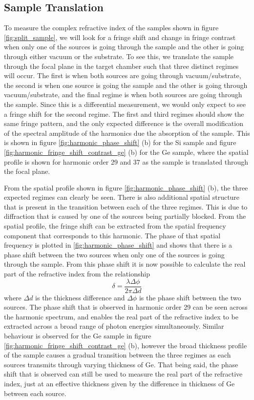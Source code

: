 \subsection{Sample Translation}
To measure the complex refractive index of the samples shown in figure \ref{fig:split_sample}, we will look for a fringe shift and change in fringe contrast when only one of the sources is going through the sample and the other is going through either vacuum or the substrate.  To see this, we translate the sample through the focal plane in the target chamber such that three distinct regimes will occur.  The first is when both sources are going through vacuum/substrate, the second is when one source is going the sample and the other is going through vacuum/substrate, and the final regime is when both sources are going through the sample.  Since this is a differential measurement, we would only expect to see a fringe shift for the second regime.  The first and third regimes should show the same fringe pattern, and the only expected difference is the overall modification of the spectral amplitude of the harmonics due the absorption of the sample.  This is shown in figure \ref{fig:harmonic_phase_shift} (b) for the Si sample and figure \ref{fig:harmonic_fringe_shift_contrast_ge} (b) for the Ge sample, where the spatial profile is shown for harmonic order 29 and 37 as the sample is translated through the focal plane.

From the spatial profile shown in figure \ref{fig:harmonic_phase_shift} (b), the three expected regimes can clearly be seen.  There is also additional spatial structure that is present in the transition between each of the three regimes.  This is due to diffraction that is caused by one of the sources being partially blocked.  From the spatial profile, the fringe shift can be extracted from the spatial frequency component that corresponds to this harmonic.  The phase of that spatial frequency is plotted in \ref{fig:harmonic_phase_shift} and shows that there is a phase shift between the two sources when only one of the sources is going through the sample.  From this phase shift it is now possible to calculate the real part of the refractive index from the relationship
\begin{equation}
	\label{eqn:fringe_shift_x}
	\delta = \frac{\lambda\Delta\phi}{2\pi\Delta d}
\end{equation}  
where $\Delta d$ is the thickness difference and $\Delta \phi$ is the phase shift between the two sources.  The phase shift that is observed in harmonic order 29 can be seen across the harmonic spectrum, and enables the real part of the refractive index to be extracted across a broad range of photon energies simultaneously.  Similar behaviour is observed for the Ge sample in figure \ref{fig:harmonic_fringe_shift_contrast_ge} (b), however the broad thickness profile of the sample causes a gradual transition between the three regimes as each sources transmits through varying thickness of Ge.  That being said, the phase shift that is observed can still be used to measure the real part of the refractive index, just at an effective thickness given by the difference in thickness of Ge between each source.

